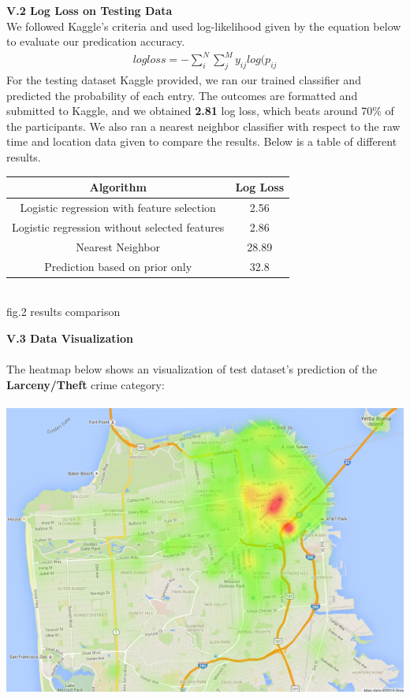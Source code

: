 \documentclass[12pt]{article}
\newenvironment{p4}[2][Part V Results and Evaluation]{\begin{trivlist}
\item[\hskip \labelsep {\bfseries #1}\hskip \labelsep {\bfseries #2}]}{\end{trivlist}}
\begin{document}
\begin{p4}{}
\item{\textbf{V.2 Log Loss on Testing Data}\\}
We followed Kaggle's criteria and used log-likelihood given by the equation below to evaluate our predication accuracy.
\begin{align*}
	logloss = -\sum_i^N \sum_j^M y_{ij} log (p_{ij}
\end{align*}
For the testing dataset Kaggle provided, we ran our trained classifier and predicted the probability of each entry. The outcomes are formatted and submitted to Kaggle, and we obtained \textbf{2.81} log loss, which beats around 70\% of the participants. We also ran a nearest neighbor classifier with respect to the raw time and location data given to compare the results. Below is a table of different results.
\begin{center}
	\begin{tabular}{||c c||} 
		\hline
	   	Algorithm & Log Loss \\
		\hline
		Logistic regression with feature selection & 2.56 \\
		\hline
		Logistic regression without selected features& 2.86 \\
		\hline
		Nearest Neighbor & 28.89 \\
		\hline
		Prediction based on prior only & 32.8 \\
		\hline
	\end{tabular}
	{\\fig.2 results comparison}
\end{center}
\item{\textbf{V.3 Data Visualization}\\}
\\
The heatmap below shows an visualization of test dataset's prediction of the \textbf{Larceny/Theft} crime category:\\
\\
\includegraphics[scale=0.5]{LARCENY_THEFT.png}
\\
\end{p4}
\end{document}
